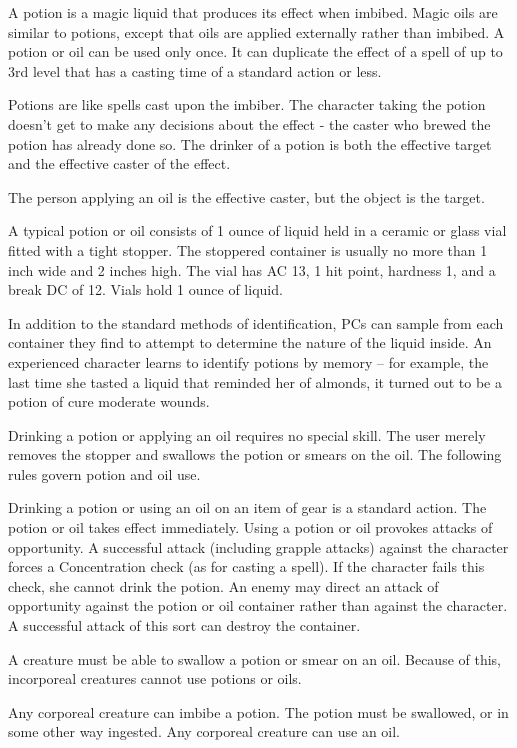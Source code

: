 A potion is a magic liquid that produces its effect when imbibed. Magic oils are similar to potions, except that oils are applied externally rather than imbibed. A potion or oil can be used only once. It can duplicate the effect of a spell of up to 3rd level that has a casting time of a standard action or less.

Potions are like spells cast upon the imbiber. The character taking the potion doesn't get to make any decisions about the effect  - the caster who brewed the potion has already done so. The drinker of a potion is both the effective target and the effective caster of the effect.

The person applying an oil is the effective caster, but the object is the target.

 A typical potion or oil consists of 1 ounce of liquid held in a ceramic or glass vial fitted with a tight stopper. The stoppered container is usually no more than 1 inch wide and 2 inches high. The vial has AC 13, 1 hit point, hardness 1, and a break DC of 12. Vials hold 1 ounce of liquid.

 In addition to the standard methods of identification, PCs can sample from each container they find to attempt to determine the nature of the liquid inside. An experienced character learns to identify potions by memory -- for example, the last time she tasted a liquid that reminded her of almonds, it turned out to be a potion of cure moderate wounds.

 Drinking a potion or applying an oil requires no special skill. The user merely removes the stopper and swallows the potion or smears on the oil. The following rules govern potion and oil use.

Drinking a potion or using an oil on an item of gear is a standard action. The potion or oil takes effect immediately. Using a potion or oil provokes attacks of opportunity. A successful attack (including grapple attacks) against the character forces a Concentration check (as for casting a spell). If the character fails this check, she cannot drink the potion. An enemy may direct an attack of opportunity against the potion or oil container rather than against the character. A successful attack of this sort can destroy the container.

A creature must be able to swallow a potion or smear on an oil. Because of this, incorporeal creatures cannot use potions or oils.

Any corporeal creature can imbibe a potion. The potion must be swallowed, or in some other way ingested. Any corporeal creature can use an oil.

